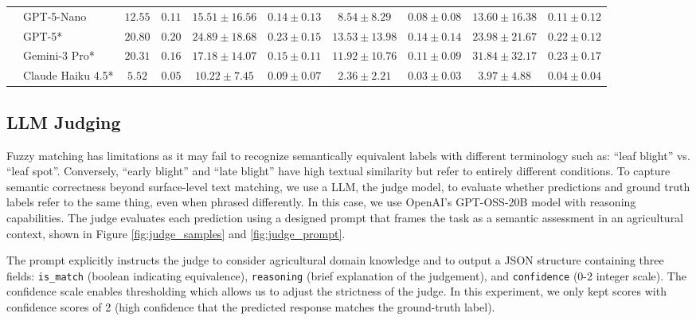 \documentclass[10pt,letterpaper]{article}
\begin{document}
\begin{table}[ht]
{\begin{tabular}{llcccccccc}
    & GPT-5-Nano
        & $12.55$ & $0.11$
        & $15.51 \pm 16.56$ & $0.14 \pm 0.13$
        & $ 8.54 \pm  8.29$ & $0.08 \pm 0.08$
        & $13.60 \pm 16.38$ & $0.11 \pm 0.12$ \\
    & GPT-5*
        & $\mathbf{20.80}$ & $\mathbf{0.20}$
        & $\mathbf{24.89} \pm 18.68$ & $\mathbf{0.23} \pm 0.15$
        & $\mathbf{13.53} \pm 13.98$ & $\mathbf{0.14} \pm 0.14$
        & $23.98 \pm 21.67$ & $0.22 \pm 0.12$ \\
    & Gemini-3 Pro*
        & $20.31$ & $0.16$
        & $17.18 \pm 14.07$ & $0.15 \pm 0.11$
        & $11.92 \pm 10.76$ & $0.11 \pm 0.09$
        & $\mathbf{31.84} \pm 32.17$ & $\mathbf{0.23} \pm 0.17$ \\
    & Claude Haiku 4.5*
        & $ 5.52$ & $0.05$
        & $10.22 \pm  7.45$ & $0.09 \pm 0.07$
        & $ 2.36 \pm  2.21$ & $0.03 \pm 0.03$
        & $ 3.97 \pm  4.88$ & $0.04 \pm 0.04$ \\
\bottomrule
\end{tabular}%
}
\end{table}

\subsection{LLM Judging}
\label{sec:llm_judging}
Fuzzy matching has limitations as it may fail to recognize semantically equivalent labels with different terminology such as: “leaf blight” vs.  “leaf spot”. Conversely, “early blight” and “late blight” have high textual similarity but refer to entirely different conditions. To capture semantic correctness beyond surface-level text matching, we use a LLM, the judge model, to evaluate whether predictions and ground truth labels refer to the same thing, even when phrased differently. In this case, we use OpenAI’s GPT-OSS-20B model \cite{openai_gpt-oss-120b_2025} with reasoning capabilities. The judge evaluates each prediction using a designed prompt that frames the task as a semantic assessment in an agricultural context, shown in Figure \ref{fig:judge_samples} and \ref{fig:judge_prompt}.

The prompt explicitly instructs the judge to consider agricultural domain knowledge and to output a JSON structure containing three fields: \texttt{is\_match} (boolean indicating equivalence), \texttt{reasoning} (brief explanation of the judgement), and \texttt{confidence} (0-2 integer scale). The confidence scale enables thresholding which allows us to adjust the strictness of the judge. In this experiment, we only kept scores with confidence scores of 2 (high confidence that the predicted response matches the ground-truth label).
\end{document}
